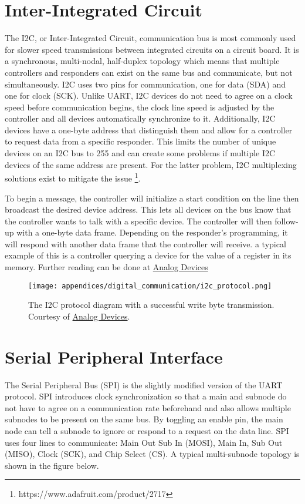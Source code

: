 \section[I2C Explained]{Inter-Integrated Circuit} 
The I2C, or Inter-Integrated Circuit, communication bus is most commonly used for slower speed transmissions between integrated circuits on a circuit board.
It is a synchronous, multi-nodal, half-duplex topology which means that multiple controllers and responders can exist on the same bus and communicate, but not simultaneously.
I2C uses two pins for communication, one for data (SDA) and one for clock (SCK).
Unlike UART, I2C devices do not need to agree on a clock speed before communication begins, the clock line speed is adjusted by the controller and all devices automatically synchronize to it.
Additionally, I2C devices have a one-byte address that distinguish them and allow for a controller to request data from a specific responder.
This limits the number of unique devices on an I2C bus to 255 and can create some problems if multiple I2C devices of the same address are present.
For the latter problem, I2C multiplexing solutions exist to mitigate the issue \footnote[3]{https://www.adafruit.com/product/2717}.

To begin a message, the controller will initialize a start condition on the line then broadcast the desired device address.
This lets all devices on the bus know that the controller wants to talk with a specific device.
The controller will then follow-up with a one-byte data frame.
Depending on the responder's programming, it will respond with another data frame that the controller will receive.
a typical example of this is a controller querying a device for the value of a register in its memory.
Further reading can be done at \href{https://www.analog.com/en/technical-articles/i2c-primer-what-is-i2c-part-1.html}{Analog Devices}

\begin{figure}[h!]
    \caption[I2C protocol diagram]{The I2C protocol diagram with a successful write byte transmission. 
    Courtesy of \href{https://www.analog.com/en/technical-articles/i2c-primer-what-is-i2c-part-1.html}{Analog Devices}.}
    \centering
    \texttt{[image: appendices/digital\_communication/i2c\_protocol.png]}
\end{figure}

\section[SPI Explained]{Serial Peripheral Interface} 
The Serial Peripheral Bus (SPI) is the slightly modified version of the UART protocol.
SPI introduces clock synchronization so that a main and subnode do not have to agree on a communication rate beforehand and also allows multiple subnodes to be present on the same bus.
By toggling an enable pin, the main node can tell a subnode to ignore or respond to a request on the data line.
SPI uses four lines to communicate: Main Out Sub In (MOSI), Main In, Sub Out (MISO), Clock (SCK), and Chip Select (CS).
A typical multi-subnode topology is shown in the figure below.


